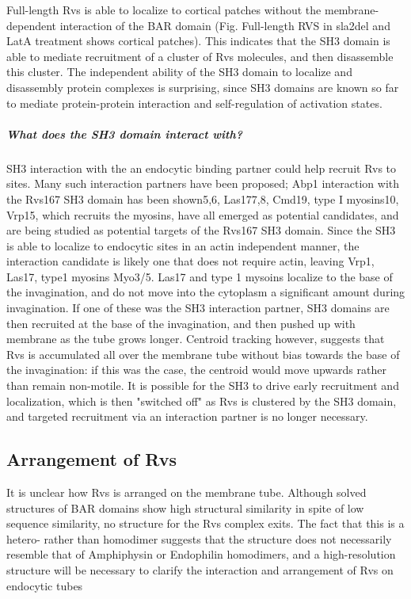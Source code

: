 Full-length Rvs is able to localize to cortical patches without the membrane-dependent interaction of the BAR domain (Fig. Full-length RVS in sla2del and LatA treatment shows cortical patches). This indicates that the SH3 domain is able to mediate recruitment of a cluster of Rvs molecules, and then disassemble this cluster.  The independent ability of the SH3 domain to localize and disassembly protein complexes is surprising, since SH3 domains are known so far to mediate protein-protein interaction and self-regulation of activation states. 


\subparagraph{What does the SH3 domain interact with?}
SH3 interaction with the an endocytic binding partner could help recruit Rvs to sites. Many such interaction partners have been proposed; Abp1 interaction with the Rvs167 SH3 domain has been shown5,6, Las177,8, Cmd19, type I myosins10, Vrp15, which recruits the myosins, have all emerged as potential candidates, and are being studied as potential targets of the Rvs167 SH3 domain. Since the SH3 is able to localize to endocytic sites in an actin independent manner, the interaction candidate is likely one that does not require actin, leaving Vrp1, Las17, type1 myosins Myo3/5. Las17 and type 1 mysoins localize to the base of the invagination, and do not move into the cytoplasm a significant amount during invagination. If one of these was the SH3 interaction partner, SH3 domains are then recruited at the base of the invagination, and then pushed up with membrane as the tube grows longer. Centroid tracking however, suggests that Rvs is accumulated all over the membrane tube without bias towards the base of the invagination: if this was the case, the centroid would move upwards rather than remain non-motile. It is possible for the SH3 to drive early recruitment and localization, which is then "switched off" as Rvs is clustered by the SH3 domain, and targeted recruitment via an interaction partner is no longer necessary. 


\subsection{Arrangement of Rvs}

It is unclear how Rvs is arranged on the membrane tube. Although solved structures of BAR domains show high structural similarity in spite of low sequence similarity, no structure for the Rvs complex exits. The fact that this is a hetero- rather than homodimer suggests that the structure does not necessarily resemble that of Amphiphysin or Endophilin homodimers, and a high-resolution structure will be necessary to clarify the interaction and arrangement of Rvs on endocytic tubes

